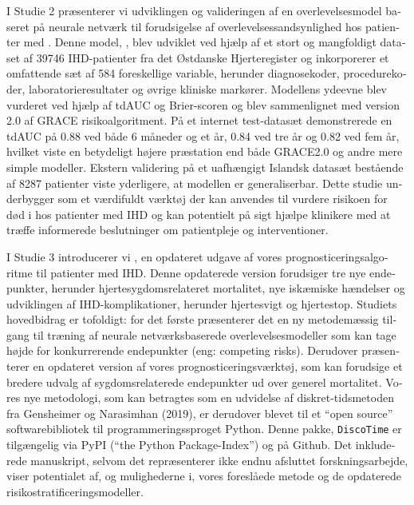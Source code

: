 \begin{@empty}
\begin{otherlanguage}{danish}
I Studie 2 præsenterer vi udviklingen og valideringen af en 
overlevelsesmodel baseret på neurale netværk til forudsigelse af 
overlevelsessandsynlighed hos patienter med .
Denne model, , blev udviklet ved hjælp af et stort
og mangfoldigt dataset af \num{39746} \acs{IHD}-patienter fra  
det Østdanske Hjerteregister og inkorporerer et
omfattende sæt af 584 foreskellige variable, herunder diagnosekoder, 
procedurekoder, laboratorieresultater og øvrige kliniske markører. 
Modellens ydeevne blev vurderet ved hjælp af \acs{tdAUC} og Brier-scoren og 
blev sammenlignet med version 2.0 af \acs{GRACE} risikoalgoritment. 
På et internet test-datasæt demonstrerede  en \ac{tdAUC} på \num{0.88}
ved både 6 måneder og et år, \num{0.84} ved tre år og \num{0.82} ved fem år, 
hvilket viste en betydeligt højere præstation end både \acs{GRACE}2.0 og 
andre mere simple modeller. Ekstern validering på
et uafhængigt Islandsk datasæt bestående af 8287 patienter viste yderligere, 
at modellen er generaliserbar.
Dette studie underbygger  som et værdifuldt værktøj der
kan anvendes til vurdere risikoen for død i hos patienter med \ac{IHD} og kan
potentielt på sigt hjælpe klinikere med at træffe informerede beslutninger om
patientpleje og interventioner.

I Studie 3 introducerer vi , en opdateret udgave af vores 
prognosticeringsalgoritme til patienter med \ac{IHD}.
Denne opdaterede version forudsiger tre nye endepunkter, herunder 
hjertesygdomsrelateret mortalitet, nye iskæmiske hændelser og
udviklingen af \ac{IHD}-komplikationer, herunder hjertesvigt og hjertestop. 
Studiets hovedbidrag er tofoldigt: for det første præsenterer det en ny
metodemæssig tilgang til træning af neurale netværksbaserede 
overlevelsesmodeller som kan tage højde for konkurrerende endepunkter 
(eng: competing risks).
Derudover præsenterer en opdateret version af vores prognosticeringsværktøj, 
som kan forudsige et bredere udvalg af sygdomsrelaterede endepunkter ud over
generel mortalitet. Vores nye metodologi, som kan betragtes som en
udvidelse af diskret-tidsmetoden fra Gensheimer og Narasimhan (2019), 
er derudover blevet til et \enquote{open source} softwarebibliotek til
programmeringssproget Python. Denne pakke, \texttt{DiscoTime} er tilgængelig
via PyPI (\enquote{the Python Package-Index}) og på Github.
Det inkluderede manuskript, selvom det repræsenterer ikke endnu afsluttet
forskningsarbejde, viser potentialet af, og mulighederne i, vores 
foreslåede metode og de opdaterede risikostratificeringsmodeller.
    
\end{otherlanguage}
\end{@empty}

